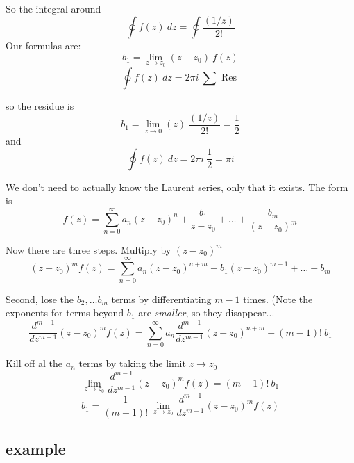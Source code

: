 \documentclass[11pt, oneside]{article}   	%
\begin{document}
So the integral around 
\[ \oint f(z) \ dz = \oint \frac{(1/z)}{2!} \]
Our formulas are:
\[ b_1 = \lim_{z \rightarrow z_0} (z-z_0) \ f(z)  \]
\[ \oint f(z) \ dz = 2 \pi i \ \sum \text{ Res } \]

so the residue is
\[ b_1 = \lim_{z \rightarrow 0} (z) \ \frac{(1/z)}{2!} = \frac{1}{2} \]
and
\[ \oint f(z) \ dz = 2 \pi i \ \frac{1}{2} = \pi i \]

We don't need to actually know the Laurent series, only that it exists.  The form is
\[ f(z) = \sum_{n=0}^{\infty} a_n(z-z_0)^n + \frac{b_1}{z-z_0} + \dots + \frac{b_m}{(z-z_0)^m} \]

Now there are three steps.  Multiply by $(z - z_0)^m$
\[ (z - z_0)^m f(z) = \sum_{n=0}^{\infty} a_n(z-z_0)^{n+m} + b_1 (z-z_0)^{m-1} + \dots + b_m \]

Second, lose the $b_2, \dots b_m$ terms by differentiating $m-1$ times.  (Note the exponents for terms beyond $b_1$ are \emph{smaller}, so they disappear...
\[ \frac{d^{m-1}}{dz^{m-1}} (z-z_0)^m f(z) = \sum_{n=0}^{\infty} a_n\frac{d^{m-1}}{dz^{m-1}}  (z-z_0)^{n+m} + (m-1)! \ b_1 \]

Kill off al the $a_n$ terms by taking the limit $z \rightarrow z_0$
\[ \lim_{z \rightarrow z_0}  \frac{d^{m-1}}{dz^{m-1}} (z-z_0)^m f(z) = (m-1)! \ b_1 \]
\[ b_1 = \frac{1}{(m-1)!} \ \lim_{z \rightarrow z_0}  \frac{d^{m-1}}{dz^{m-1}} (z-z_0)^m f(z) \]

\subsection*{example}
\end{document}
